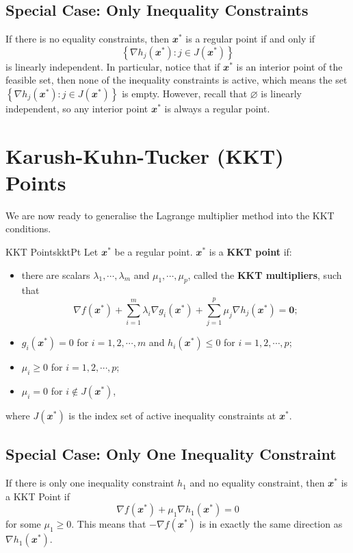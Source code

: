 \documentclass[math, code]{amznotes}
\theoremstyle{remark}
\begin{document}
\subsection{Special Case: Only Inequality Constraints}
If there is no equality constraints, then $\mathbfit{x}^*$ is a regular point if and only if 
\begin{equation*}
    \left\{\nabla h_j(\mathbfit{x}^*) \colon j \in J(\mathbfit{x}^*)\right\}
\end{equation*}
is linearly independent. In particular, notice that if $\mathbfit{x}^*$ is an interior point of the feasible set, then none of the inequality constraints is active, which means the set $\left\{\nabla h_j(\mathbfit{x}^*) \colon j \in J(\mathbfit{x}^*)\right\}$ is empty. However, recall that $\varnothing$ is linearly independent, so any interior point $\mathbfit{x}^*$ is always a regular point.

\section{Karush-Kuhn-Tucker (KKT) Points}
We are now ready to generalise the Lagrange multiplier method into the KKT conditions.
\begin{dfnbox}{KKT Points}{kktPt}
    Let $\mathbfit{x}^*$ be a regular point. $\mathbfit{x}^*$ is a {\color{red} \textbf{KKT point}} if:
    \begin{itemize}
        \item there are scalars $\lambda_1, \cdots, \lambda_m$ and $\mu_1, \cdots, \mu_p$, called the {\color{red} \textbf{KKT multipliers}}, such that
        \begin{equation*}
            \nabla f(\mathbfit{x}^*) + \sum_{i = 1}^{m}\lambda_i\nabla g_i(\mathbfit{x}^*) + \sum_{j = 1}^{p}\mu_j\nabla h_j(\mathbfit{x}^*) = \mathbf{0};
        \end{equation*}
        \item $g_i(\mathbfit{x}^*) = 0$ for $i = 1, 2, \cdots, m$ and $h_i(\mathbfit{x}^*) \leq 0$ for $i = 1, 2, \cdots, p$;
        \item $\mu_i \geq 0$ for $i = 1, 2, \cdots, p$;
        \item $\mu_i = 0$ for $i \notin J(\mathbfit{x}^*)$,
    \end{itemize}
    where $J(\mathbfit{x}^*)$ is the index set of active inequality constraints at $\mathbfit{x}^*$.
\end{dfnbox}
\subsection{Special Case: Only One Inequality Constraint}
If there is only one inequality constraint $h_1$ and no equality constraint, then $\mathbfit{x}^*$ is a KKT Point if
\begin{equation*}
    \nabla f(\mathbfit{x}^*) + \mu_1\nabla h_1(\mathbfit{x}^*) = 0
\end{equation*}
for some $\mu_1 \geq 0$. This means that $-\nabla f(\mathbfit{x}^*)$ is in exactly the same direction as $\nabla h_1(\mathbfit{x}^*)$.
\end{document}

